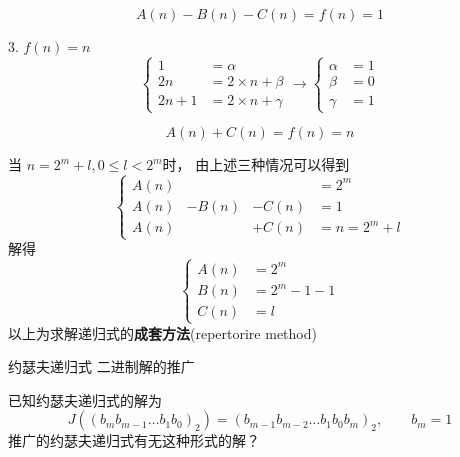\begin{equation*}
	A(n)-B(n)-C(n) = f(n) = 1
\end{equation*}

3. $ f(n) = n $
\begin{equation*}
	\left\{
	\begin{aligned}
		1    &= \alpha             \\
		2n   &= 2\times n + \beta  \\
		2n+1 &= 2\times n + \gamma 
	\end{aligned}	
	\right.
	\rightarrow
	\left\{
	\begin{aligned}
		\alpha &= 1  \\
		\beta  &= 0  \\ 
		\gamma &= 1
	\end{aligned}
	\right.	
\end{equation*}

\begin{equation*}
	A(n) + C(n) = f(n) = n
\end{equation*}

当 $ n = 2^m+l, 0\leqslant l< 2^m $时，
由上述三种情况可以得到
\begin{equation*}
	\left\{
	\begin{aligned}
		A(n) &       &          &= 2^m        \\
		A(n) &- B(n) &-  C(n)   &= 1          \\
		A(n) &       &+  C(n)   &= n = 2^m+l
	\end{aligned}
	\right.
\end{equation*}
解得
\begin{equation*}
	\left\{
	\begin{aligned}
		A(n) &= 2^m        \\
		B(n) &= 2^m-1-1    \\
		C(n) &= l
	\end{aligned}
	\right.
\end{equation*}
以上为求解递归式的\textbf{成套方法}(repertorire method)

\begin{remark}
	约瑟夫递归式 二进制解的推广
\end{remark}
已知约瑟夫递归式的解为
\begin{equation*}
	J((b_m b_{m-1}\dots b_1 b_0)_2) = (b_{m-1} b_{m-2}\dots b_1 b_0 b_m)_2, \qquad b_m = 1
\end{equation*}
推广的约瑟夫递归式有无这种形式的解？

